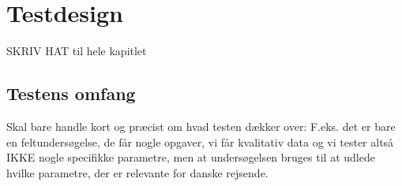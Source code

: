 \chapter{Testdesign}
\label{ParametreTestdesign}
%
SKRIV HAT til hele kapitlet 
%
\section{Testens omfang}
\label{ParametreTestensOmfangValgAfGestikker}
%
Skal bare handle kort og præcist om hvad testen dækker over: F.eks. det er bare en feltundersøgelse, de får nogle opgaver, vi får kvalitativ data og vi tester altså IKKE nogle specifikke parametre, men at undersøgelsen bruges til at udlede hvilke parametre, der er relevante for danske rejsende. 